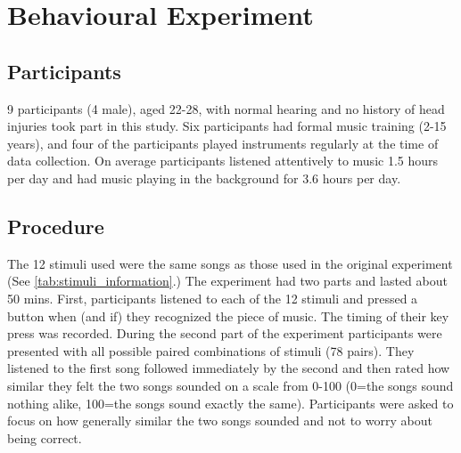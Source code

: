 \chapter{Behavioural Experiment}
\section{Participants}
9 participants (4 male), aged 22-28, with normal hearing and no history of head injuries took part in this study. 
Six participants had formal music training (2-15 years), and four of the participants played instruments regularly at the time of data collection. 
On average participants listened attentively to music 1.5 hours per day and had music playing in the background for 3.6 hours per day.
\section{Procedure}
The 12 stimuli used were the same songs as those used in the original experiment (See \autoref{tab:stimuli_information}.)
The experiment had two parts and lasted about 50 mins.
First, participants listened to each of the 12 stimuli and pressed a button when (and if) they recognized the piece of music.
The timing of their key press was recorded. 
During the second part of the experiment participants were presented with all possible paired combinations of stimuli (78 pairs). 
They listened to the first song followed immediately by the second and then rated how similar they felt the two songs sounded on a scale from 0-100 (0=the songs sound nothing alike, 100=the songs sound exactly the same).
Participants were asked to focus on how generally similar the two songs sounded and not to worry about being correct.
